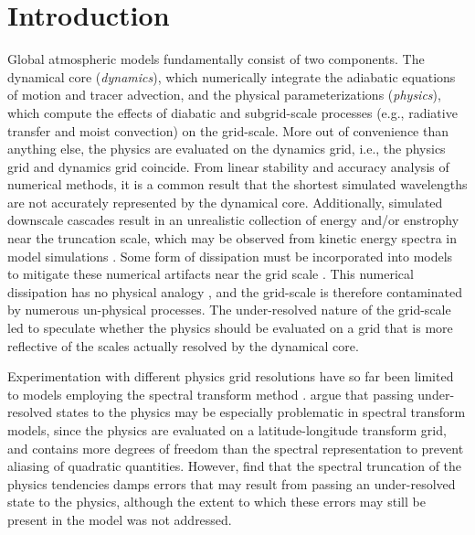 \documentclass{agujournal}
\begin{document}

\section{Introduction}\label{sec:intro}

Global atmospheric models fundamentally consist of two components. The dynamical core ({\em{dynamics}}), which numerically integrate the adiabatic equations of motion and tracer advection, and the physical parameterizations ({\em{physics}}), which compute the effects of diabatic and subgrid-scale processes (e.g., radiative transfer and moist convection) on the grid-scale. More out of convenience than anything else, the physics are evaluated on the dynamics grid, i.e., the physics grid and dynamics grid coincide. From linear stability and accuracy analysis of numerical methods, it is a common result that the shortest simulated wavelengths are not accurately represented by the dynamical core. Additionally, simulated downscale cascades result in an unrealistic collection of energy and/or enstrophy near the truncation scale, which may be observed from kinetic energy spectra in model simulations \citep{S2011LNCSE}. Some form of dissipation must be incorporated into models to mitigate these numerical artifacts near the grid scale \citep{JW2010LNCSE}. This numerical dissipation has no physical analogy \citep[although see][]{GMR2007}, and the grid-scale is therefore contaminated by numerous un-physical processes. The under-resolved nature of the grid-scale led \cite{LH1997MWR} to speculate whether the physics should be evaluated on a grid that is more reflective of the scales actually resolved by the dynamical core.

Experimentation with different physics grid resolutions have so far been limited to models employing the spectral transform method \citep{LH1997MWR,W1999T,W2014PTRSL}. \cite{LH1997MWR} argue that passing under-resolved states to the physics may be especially problematic in spectral transform models, since the physics are evaluated on a latitude-longitude transform grid, and contains more degrees of freedom than the spectral representation to prevent aliasing of quadratic quantities. However, \cite{LH1997MWR} find that the spectral truncation of the physics tendencies damps errors that may result from passing an under-resolved state to the physics, although the extent to which these errors may still be present in the model was not addressed. 
\end{document}
